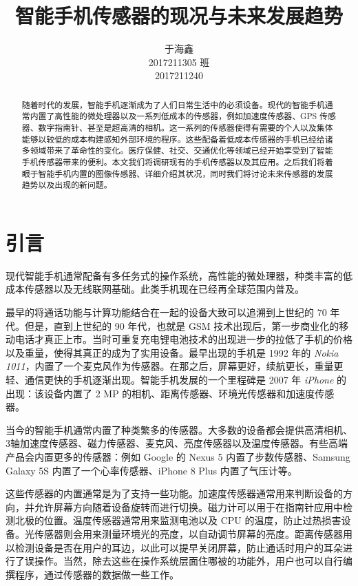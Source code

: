 \documentclass[lang=cn]{elegantpaper}
\title{智能手机传感器的现况与未来发展趋势}
\author{于海鑫 \\ 2017211305 班 \\ 2017211240}
\institute{北京邮电大学计算机学院}
\date{\zhtoday}
\begin{document}
\maketitle

\begin{abstract}
    随着时代的发展，智能手机逐渐成为了人们日常生活中的必须设备。现代的智能手机通常内置了高性能的微处理器以及一系列低成本的传感器，例如加速度传感器、GPS 传感器、数字指南针、甚至是超高清的相机。这一系列的传感器使得有需要的个人以及集体能够以较低的成本构建感知外部环境的程序。这些配备着低成本传感器的手机已经给诸多领域带来了革命性的变化。医疗保健、社交、交通优化等领域已经开始享受到了智能手机传感器带来的便利。本文我们将调研现有的手机传感器以及其应用。之后我们将着眼于智能手机内置的图像传感器、详细介绍其状况，同时我们将讨论未来传感器的发展趋势以及出现的新问题。
\end{abstract}

\section{引言}

现代智能手机通常配备有多任务式的操作系统，高性能的微处理器，种类丰富的低成本传感器以及无线联网基础。此类手机现在已经再全球范围内普及。

最早的将通话功能与计算功能结合在一起的设备大致可以追溯到上世纪的 70 年代。但是，直到上世纪的 90 年代，也就是 GSM 技术出现后，第一步商业化的移动电话才真正上市。当时可重复充电锂电池技术的出现进一步的拉低了手机的价格以及重量，使得其真正的成为了实用设备。最早出现的手机是 1992 年的 \emph{Nokia 1011}，内置了一个麦克风作为传感器。在那之后，屏幕更好，续航更长，重量更轻、通信更快的手机逐渐出现。智能手机发展的一个里程碑是 2007 年 \emph{iPhone} 的出现：该设备内置了 2 MP 的相机、距离传感器、环境光传感器和加速度传感器。

当今的智能手机通常内置了种类繁多的传感器。大多数的设备都会提供高清相机、3轴加速度传感器、磁力传感器、麦克风、亮度传感器以及温度传感器。有些高端产品会内置更多的传感器：例如 Google 的 Nexus 5 内置了步数传感器、Samsung Galaxy 5S 内置了一个心率传感器、iPhone 8 Plus 内置了气压计等。

这些传感器的内置通常是为了支持一些功能。加速度传感器通常用来判断设备的方向，并允许屏幕方向随着设备旋转而进行切换。磁力计可以用于在指南针应用中检测北极的位置。温度传感器通常用来监测电池以及 CPU 的温度，防止过热损害设备。光传感器则会用来测量环境光的亮度，以自动调节屏幕的亮度。距离传感器用以检测设备是否在用户的耳边，以此可以提早关闭屏幕，防止通话时用户的耳朵进行了误操作。当然，除去这些在操作系统层面住哪被的功能外，用户也可以自行编撰程序，通过传感器的数据做一些工作。
\end{document}
